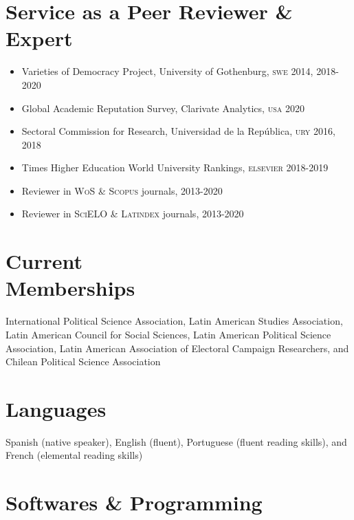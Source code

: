 \documentclass[letterpaper,margin]{res}
\begin{document}
\begin{resume}

\section{\footnotesize Service as a Peer Reviewer \& Expert}

\begin{itemize}
\item{\small Varieties of Democracy Project, University of Gothenburg, {\scshape swe} 2014, 2018-2020}
\item{\small Global Academic Reputation Survey, Clarivate Analytics, {\scshape usa} 2020}
\item{\small Sectoral Commission for Research, Universidad de la Rep\'ublica, {\scshape ury} 2016, 2018}
\item{\small Times Higher Education World University Rankings, {\scshape elsevier} 2018-2019}
\item{\small Reviewer in {\scshape WoS} \& {\scshape Scopus} journals, 2013-2020}
\item{\small Reviewer in {\scshape SciELO} \& {\scshape Latindex} journals, 2013-2020}
\end{itemize}


\section{\footnotesize Current \\ Memberships}

{\small International Political Science Association, Latin American Studies Association, Latin American Council for Social Sciences, Latin American Political Science Association, Latin American Association of Electoral Campaign Researchers, and Chilean Political Science Association}


\section{\footnotesize Languages}

{\small Spanish (native speaker), English (fluent), Portuguese (fluent reading skills), and French (elemental reading skills)}


\section{\footnotesize Softwares \& Programming}


\end{resume}
\end{document}
